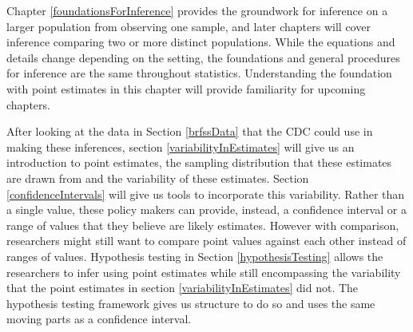 Chapter \ref {foundationsForInference} provides the groundwork for inference on a larger population from observing one sample, and later chapters will cover inference comparing two or more distinct populations. While the equations and details change depending on the setting, the foundations and general procedures for inference are the same throughout statistics. Understanding the foundation with point estimates in this chapter will provide familiarity for upcoming chapters. 

After looking at the data in Section \ref{brfssData} that the CDC could use in making these inferences, section \ref{variabilityInEstimates} will give us an introduction to point estimates, the sampling distribution that these estimates are drawn from and the variability of these estimates. Section \ref{confidenceIntervals} will give us tools to incorporate this variability. Rather than a single value, these policy makers can provide, instead, a confidence interval or a range of values that they believe are likely estimates. However with comparison, researchers might still want to compare point values against each other instead of ranges of values. Hypothesis testing in Section \ref{hypothesisTesting} allows the researchers to infer using point estimates while still encompassing the variability that the point estimates in section \ref{variabilityInEstimates} did not. The hypothesis testing framework gives us structure to do so and uses the same moving parts as a confidence interval. 

